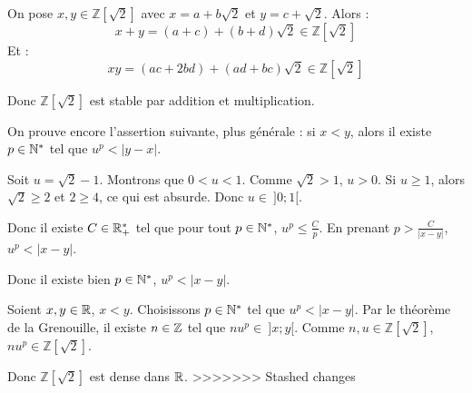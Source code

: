 \documentclass[]{../templates/homework}
\begin{document}
\subproblem
\newcommand{\Ztwo}{\mathbb Z[\sqrt 2]}
\question On pose $x,y \in \Ztwo$ avec $x = a + b\sqrt2$ et $y = c+\sqrt 2$. Alors :
\begin{equation*}
	x+y = (a+c) + (b+d)\sqrt 2 \in \Ztwo
\end{equation*}
Et :
\begin{equation*}
	xy = (ac+2bd) + (ad + bc)\sqrt 2 \in \Ztwo
\end{equation*}

Donc $\Ztwo$ est stable par addition et multiplication.

\question On prouve encore l'assertion suivante, plus générale : si $x < y$, alors il existe $p\in\mathbb N^*$ tel que $u^p < |y-x|$. 

 Soit $u = \sqrt 2 -1$. Montrons que $0<u<1$. Comme $\sqrt 2 > 1$, $u>0$. Si $u \geq 1$, alors $\sqrt 2 \geq 2$ et $2 \geq 4$, ce qui est absurde. Donc $u\in\ ]0;1[$.

Donc il existe $C \in \mathbb R_+^*$ tel que pour tout $p\in\mathbb N^*$, $u^p \leq \frac C p$. En prenant $p > \frac C {|x-y|}$, $u^p < |x-y|$.

Donc il existe bien $p\in\mathbb N^*$, $u^p < |x-y|$.

\question Soient $x,y\in\mathbb R$, $x<y$. Choisissons $p\in\mathbb N^*$ tel que $u^p < |x-y|$. Par le théorème de la Grenouille, il existe $n\in\mathbb Z$ tel que $nu^p \in\ ]x;y[$. Comme $n,u\in\Ztwo$, $nu^p\in\Ztwo$. 

Donc $\Ztwo$ est dense dans $\mathbb R$.
>>>>>>> Stashed changes
\end{document}
